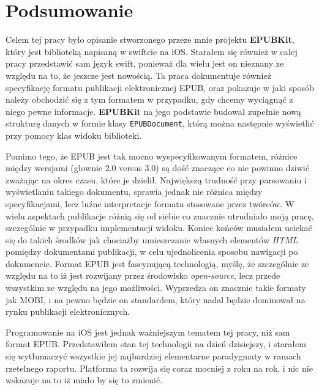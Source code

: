 \chapter{Podsumowanie}

Celem tej pracy było opisanie stworzonego przeze mnie projektu \textbf{EPUBKit}, który jest biblioteką napisaną w swiftcie na iOS. Starałem się również w całej pracy przedstawić sam język swift, ponieważ dla wielu jest on nieznany ze względu na to, że jeszcze jest nowością. Ta praca dokumentuje również specyfikację formatu publikacji elektronicznej EPUB, oraz pokazuje w jaki sposób należy obchodzić się z tym formatem w przypadku, gdy chcemy wyciągnąć z niego pewne informacje. \textbf{EPUBKit} na jego podstawie budował zupełnie nową strukturę danych w formie klasy \texttt{EPUBDocument}, którą można następnie wyświetlić przy pomocy klas widoku biblioteki.

Pomimo tego, że EPUB jest tak mocno wyspecyfikowanym formatem, różnice między wersjami (głownie 2.0 versus 3.0) są dość znaczące co nie powinno dziwić zważając na okres czasu, które je dzielił. Największą trudność przy parsowaniu i wyświetlaniu takiego dokumentu, sprawia jednak nie różnica między specyfikacjami, lecz luźne interpretacje formatu stosowane przez twórców. W wielu aspektach publikacje różnią się od siebie co znacznie utrudniało moją pracę, szczególnie w przypadku implementacji widoku. Koniec końców musiałem uciekać się do takich środków jak chociażby umieszczanie własnych elementów \textit{HTML} pomiędzy dokumentami publikacji, w celu ujednolicenia sposobu nawigacji po dokumencie. Format EPUB jest fascynującą technologią, myślę, że szczególnie ze względu na to iż jest rozwijany przez środowisko \textit{open-source}, lecz przede wszystkim ze względu na jego możliwości. Wyprzedza on znacznie takie formaty jak MOBI, i na pewno będzie on standardem, który nadal będzie dominował na rynku publikacji elektronicznych.

Programowanie na iOS jest jednak ważniejszym tematem tej pracy, niż sam format EPUB. Przedstawiłem stan tej technologii na dzień dzisiejszy, i starałem się wytłumaczyć wszystkie jej najbardziej elementarne paradygmaty w ramach rzetelnego raportu. Platforma ta rozwija się coraz mocniej z roku na rok, i nic nie wskazuje na to iż miało by się to zmienić.
